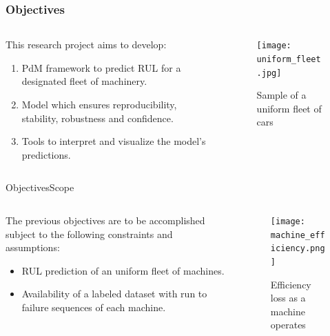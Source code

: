 \documentclass{beamer}
\begin{document}
        \begin{frame}
            \frametitle{Objectives}
            \begin{columns}
                \begin{column}{0.45\textwidth}
                    This research project aims to develop:
                    \begin{enumerate}
                        \item PdM framework to predict RUL for a designated fleet of machinery.
                        \item Model which ensures reproducibility, stability, robustness and confidence.
                        \item Tools to interpret and visualize the model's predictions.
                    \end{enumerate}
                \end{column}
                \begin{column}{0.55\textwidth}
                    \begin{figure}[!htbp]
                        \centering
                        \texttt{[image: uniform\_fleet.jpg]}
                        \caption{Sample of a uniform fleet of cars}
                    \end{figure}
                \end{column}
            \end{columns}
        \end{frame}

        \begin{frame}{Objectives}{Scope}
            \begin{columns}
                \begin{column}{0.5\textwidth}
                    The previous objectives are to be accomplished subject to the following constraints and assumptions:
                    \begin{itemize}
                        \item RUL prediction of an uniform fleet of machines.
                        \item Availability of a labeled dataset with run to failure sequences of each machine.
                    \end{itemize}
                \end{column}
                \begin{column}{0.5\textwidth}
                    \begin{figure}[!htbp]
                        \centering
                        \texttt{[image: machine\_efficiency.png]}
                        \caption{Efficiency loss as a machine operates}
                    \end{figure}
                \end{column}
            \end{columns}
        \end{frame}
\end{document}

